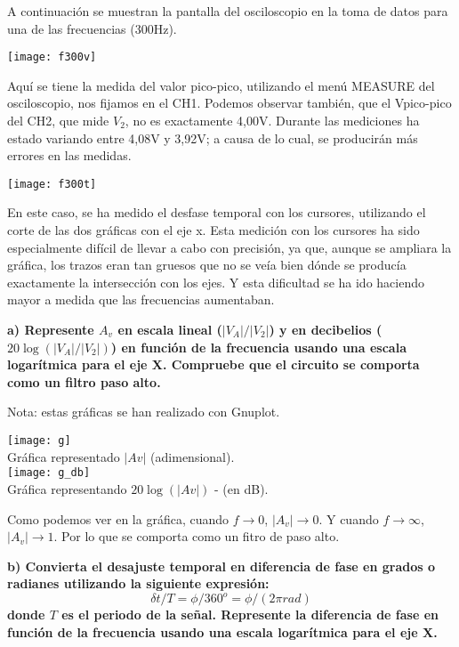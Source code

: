 \documentclass{article}
\begin{document}
A continuación se muestran la pantalla del osciloscopio en la toma de datos para una de las frecuencias (300Hz).

\begin{center}
\texttt{[image: f300v]}\\
\end{center}
Aquí se tiene la medida del valor pico-pico, utilizando el menú MEASURE del osciloscopio, nos fijamos en el CH1. Podemos observar también, que el Vpico-pico del CH2, que mide  $V_2$, no es exactamente 4,00V. Durante las mediciones ha estado variando entre 4,08V y 3,92V; a causa de lo cual, se producirán más errores en las medidas.\\
\begin{center}
\texttt{[image: f300t]}\\
\end{center}
En este caso, se ha medido el desfase temporal con los cursores, utilizando el corte de las dos gráficas con el eje x. Esta medición con los cursores ha sido especialmente difícil de llevar a cabo con precisión, ya que, aunque se ampliara la gráfica, los trazos eran tan gruesos que no se veía bien dónde se producía exactamente la intersección con los ejes. Y esta dificultad se ha ido haciendo mayor a medida que las frecuencias aumentaban.


\cleardoublepage

\textbf{a) Represente $A_v$ en escala lineal ($|V_A|/|V_2|$) y en decibelios ($20 \log (|V_A|/|V_2|)$) en función de la frecuencia usando una escala logarítmica para el eje X. Compruebe que el circuito se comporta como un filtro paso alto.}

Nota: estas gráficas se han realizado con Gnuplot.

\begin{center}
\texttt{[image: g]}\\
Gráfica representado $|Av|$ (adimensional).\\
\bigskip
\bigskip
\texttt{[image: g\_db]}\\
Gráfica representando $20 \log (|Av|)$ - (en dB).
\end{center}

Como podemos ver en la gráfica, cuando $f\rightarrow 0$, $|A_v|\rightarrow 0$. Y cuando $f\rightarrow \infty$, $|A_v|\rightarrow 1$. Por lo que se comporta como un fitro de paso alto.

\cleardoublepage
\textbf{b) Convierta el  desajuste  temporal  en  diferencia  de  fase  en  grados  o  radianes utilizando la siguiente expresión:
$$\delta t/T=\phi /360^o=\phi /(2\pi rad)$$
donde $T$ es el periodo de la señal. Represente la diferencia de fase en función de la frecuencia usando una escala logarítmica para el eje X.}\\
\end{document}
